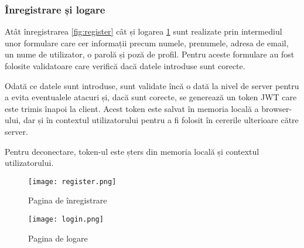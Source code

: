 

\subsubsection{Înregistrare și logare}
Atât înregistrarea \ref{fig:register} cât și logarea \ref{fig:login} sunt realizate prin
intermediul unor formulare care cer informații precum numele, prenumele, adresa de email,
un nume de utilizator, o parolă și poză de profil. Pentru aceste formulare au fost folosite
validatoare care verifică dacă datele introduse sunt corecte.
\par
Odată ce datele sunt introduse, sunt validate încă o dată la nivel de server pentru a evita 
eventualele atacuri și, dacă sunt corecte, se generează un token JWT care este trimis înapoi
la client. Acest token este salvat în memoria locală a browser-ului, dar și în contextul
utilizatorului pentru a fi folosit în cererile ulterioare către server.
\par
Pentru deconectare, token-ul este șters din memoria locală și contextul utilizatorului.

\begin{figure}[h] 
    \centering
    \begin{minipage}{0.49\textwidth}
        \centering
        \texttt{[image: register.png]}
        \caption{Pagina de înregistrare}
        \label{fig:register}
    \end{minipage}\hfill
    \begin{minipage}{0.49\textwidth}
        \centering
        \texttt{[image: login.png]}
        \caption{Pagina de logare}
        \label{fig:login}
    \end{minipage}
\end{figure}

